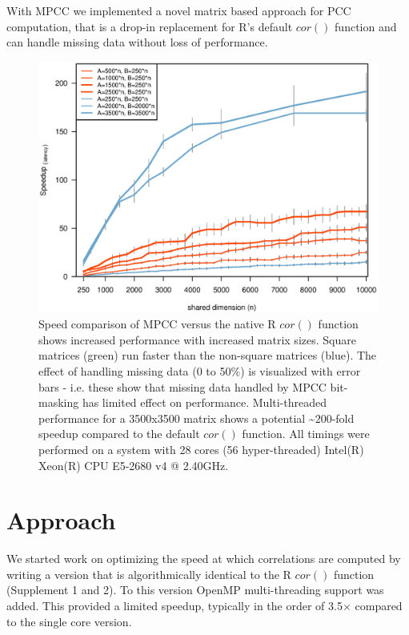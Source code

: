 \documentclass{bioinfo}
\begin{document}
With MPCC we implemented a novel matrix based approach for PCC 
computation, that is a drop-in replacement for R's default $cor()$ 
function and can handle missing data without loss of performance.

\begin{figure}[H]
\centering
\includegraphics[width=\linewidth]{img/figure02big.eps}
  \caption{ \small Speed comparison of MPCC versus the native R $cor()$
  function shows increased performance with increased matrix
  sizes. Square matrices (green) run faster than the non-square
  matrices (blue).  The effect of handling missing data (0 to 50\%) is
  visualized with error bars - i.e. these show that missing data
  handled by MPCC bit-masking has limited effect on performance.
  Multi-threaded performance for a 3500x3500 matrix shows a potential
   \textasciitilde{}$200$-fold speedup compared to the default $cor()$ function.  All
  timings were performed on a system with 28 cores (56 hyper-threaded)
  Intel(R) Xeon(R) CPU E5-2680 v4 @ 2.40GHz.  } \label{fig:fig1}
\end{figure}

\vspace*{-10mm}


\section{Approach}

We started work on optimizing the speed at which correlations are computed 
by writing a version that is algorithmically identical to the R $cor()$ function
(Supplement 1 and 2). To this version OpenMP multi-threading support was added. 
This provided a limited speedup, typically in the order of
3.5$\times$ compared to the single core version. 
\end{document}
